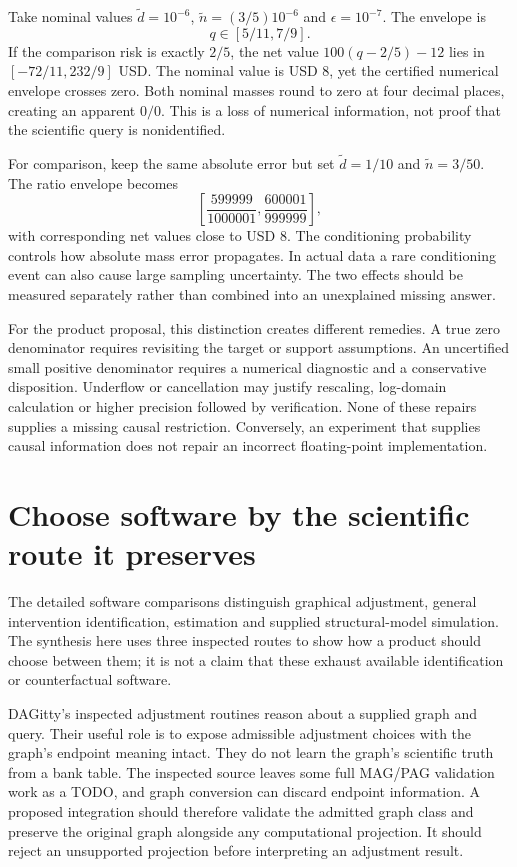 Take nominal values
$\widetilde d=10^{-6}$,
$\widetilde n=(3/5)10^{-6}$ and $\epsilon=10^{-7}$.
The envelope is
\[
 q\in[5/11,7/9].
\]
If the comparison risk is exactly $2/5$, the net value
$100(q-2/5)-12$ lies in
$[-72/11,232/9]$ USD. The nominal value is USD 8,
yet the certified numerical envelope crosses zero.
Both nominal masses round to zero at four decimal
places, creating an apparent $0/0$. This is a loss
of numerical information, not proof that the
scientific query is nonidentified.~\citep{exec17_s3_exact}

For comparison, keep the same absolute error but set
$\widetilde d=1/10$ and
$\widetilde n=3/50$. The ratio envelope becomes
\[
 \left[\frac{599999}{1000001},
       \frac{600001}{999999}\right],
\]
with corresponding net values close to USD 8.
The conditioning probability controls how absolute mass
error propagates. In actual data a rare conditioning
event can also cause large sampling uncertainty. The
two effects should be measured separately rather than
combined into an unexplained missing answer.

For the product proposal, this distinction creates
different remedies. A true zero denominator requires
revisiting the target or support assumptions. An
uncertified small positive denominator requires a
numerical diagnostic and a conservative disposition.
Underflow or cancellation may justify rescaling,
log-domain calculation or higher precision followed
by verification. None of these repairs supplies a
missing causal restriction. Conversely, an experiment
that supplies causal information does not repair an
incorrect floating-point implementation.

\section{Choose software by the scientific route it preserves}
\label{exec17:s3-software}

The detailed software comparisons distinguish graphical
adjustment, general intervention identification,
estimation and supplied structural-model simulation.
The synthesis here uses three inspected routes to show
how a product should choose between them; it is not a
claim that these exhaust available identification or
counterfactual software.

DAGitty's inspected adjustment routines reason about a
supplied graph and query. Their useful role is to expose
admissible adjustment choices with the graph's endpoint
meaning intact. They do not learn the graph's scientific
truth from a bank table. The inspected source leaves
some full MAG/PAG validation work as a TODO, and graph
conversion can discard endpoint information. A proposed
integration should therefore validate the admitted
graph class and preserve the original graph alongside
any computational projection. It should reject an
unsupported projection before interpreting an adjustment
result.~\citep{exec13_other_dagitty,exec14_olatent_dagitty}

